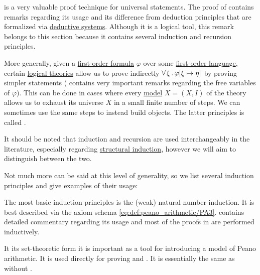 \begin{remark}\label{rem:induction}
   is a very valuable proof technique for universal statements. The proof of  contains remarks regarding its usage and its difference from deduction principles that are formalized via \hyperref[def:deductive_system]{deductive systems}. Although it is a logical tool, this remark belongs to this section because it contains several induction and recursion principles.

  More generally, given a \hyperref[def:first_order_syntax/formula]{first-order formula} \( \varphi \) over some \hyperref[def:first_order_syntax]{first-order language}, certain \hyperref[def:first_order_theory]{logical theories} allow us to prove indirectly \( \forall \thinspace \xi \thinspace . \thinspace \varphi[\xi \mapsto \eta] \) by proving simpler statements ( contains very important remarks regarding the free variables of \( \varphi \)). This can be done in cases where every \hyperref[def:first_order_semantics/satisfiability]{model} \( X = (X, I) \) of the theory allows us to exhaust its universe \( X \) in a small finite number of steps. We can sometimes use the same steps to instead build objects. The latter principles is called .

  It should be noted that induction and recursion are used interchangeably in the literature, especially regarding \hyperref[rem:structural_recursion_and_induction]{structural induction}, however we will aim to distinguish between the two.

  Not much more can be said at this level of generality, so we list several induction principles and give examples of their usage:
  \begin{thmenum}
     The most basic induction principles is the (weak) natural number induction. It is best described via the axiom schema \eqref{eq:def:peano_arithmetic/PA3}.  contains detailed commentary regarding its usage and most of the proofs in  are performed inductively.

    It its set-theoretic form  it is important as a tool for introducing a model of Peano arithmetic. It is used directly for proving  and . It is essentially the same as  without .


\end{thmenum}
\end{remark}
